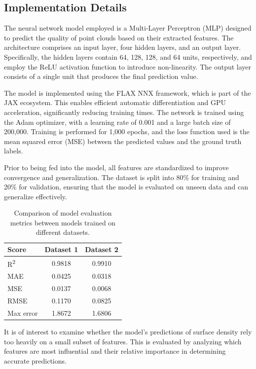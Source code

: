 \subsection{Implementation Details}

The neural network model employed is a Multi-Layer Perceptron (MLP) designed to predict the quality of point clouds based on their extracted features. The architecture comprises an input layer, four hidden layers, and an output layer. Specifically, the hidden layers contain 64, 128, 128, and 64 units, respectively, and employ the ReLU activation function to introduce non-linearity. The output layer consists of a single unit that produces the final prediction value.

The model is implemented using the FLAX NNX framework, which is part of the JAX ecosystem. This enables efficient automatic differentiation and GPU acceleration, significantly reducing training times. The network is trained using the Adam optimizer, with a learning rate of 0.001 and a large batch size of 200{,}000. Training is performed for 1{,}000 epochs, and the loss function used is the mean squared error (MSE) between the predicted values and the ground truth labels.

Prior to being fed into the model, all features are standardized to improve convergence and generalization. The dataset is split into 80\% for training and 20\% for validation, ensuring that the model is evaluated on unseen data and can generalize effectively.

\begin{table}[htbp]
\centering
\begin{tabular}{|l|c|c|}
\hline
\textbf{Score} & \textbf{Dataset 1} & \textbf{Dataset 2} \\
\hline
R\textsuperscript{2} & 0.9818 & 0.9910 \\
MAE & 0.0425 & 0.0318 \\
MSE & 0.0137 & 0.0068 \\
RMSE & 0.1170 & 0.0825 \\
Max error & 1.8672 & 1.6806 \\
\hline
\end{tabular}
\vspace{0.5em}  %
\caption{Comparison of model evaluation metrics between models trained on different datasets.}
\label{tab:model_metrics}
\end{table}

It is of interest to examine whether the model's predictions of surface density rely too heavily on a small subset of features. This is evaluated by analyzing which features are most influential and their relative importance in determining accurate predictions.

